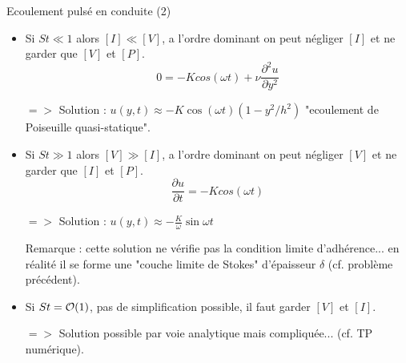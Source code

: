  \begin{frame}{ Ecoulement pulsé en conduite (2) }

\small

\begin{itemize}
\item Si $St \ll 1$ alors $[I] \ll [V]$, a l'ordre dominant on peut négliger $[I]$ et ne garder que $[V]$ et $[P]$.
$$ 
0 = - K cos(\omega t) + \nu \frac{\partial^2 u}{\partial y^2 }
$$

$=>$ Solution : $u(y,t) \approx - K \cos (\omega t) \left( 1 - y^2/h^2 \right) $ "ecoulement de Poiseuille quasi-statique".

\medskip 

\item  
Si $St \gg 1$ alors $[V] \gg [I]$, a l'ordre dominant on peut négliger $[V]$ et ne garder que $[I]$ et $[P]$.
$$ 
\frac{\partial u}{\partial t}  = - K cos(\omega t) 
$$

$=>$ Solution : $u(y,t) \approx - \frac{K}{\omega} \sin \omega t$

Remarque : cette solution ne vérifie pas la condition limite d'adhérence... en réalité il se forme une "couche limite de Stokes" d'épaisseur $\delta$ (cf. problème précédent). 
 
 \medskip

\item 
Si $St = {\cal  O}(1)$, pas de simplification possible, il faut garder $[V]$ et $[I]$.

$=>$ Solution possible par voie analytique mais compliquée... (cf. TP numérique).

\end{itemize}

 
 \end{frame}





